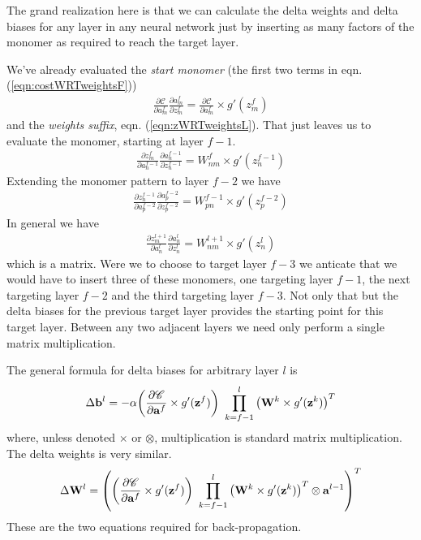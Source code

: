\documentclass[twocolumn]{revtex4-1}
\newcommand{\bld}[1]{\vectorbold{#1}}
\newcommand{\cC}{\mathscr{C}}
\newcommand{\parpar}[2]{\frac{\partial #1}{\partial #2}}
\begin{document}
The grand realization here is that we can calculate the delta weights and delta biases for any layer in any neural network just by inserting as many factors of the monomer as required to reach the target layer.

We've already evaluated the \textit{start monomer} (the first two terms in eqn. (\ref{eqn:costWRTweightsF}))
\begin{align}
    \label{eqn:startMonomer}
    \parpar{\cC}{a^f_m} \parpar{a^f_m}{z^f_m} = \parpar{\cC}{a^f_m} \times g'(z^f_m)
\end{align}
and the \textit{weights suffix}, eqn. (\ref{eqn:zWRTweightsL}). That just leaves us to evaluate the monomer, starting at layer $f-1$.
\begin{align}
    \label{eqn:monomerAtFm1}
    \parpar{z^f_m}{a^{f-1}_n} \parpar{a^{f-1}_n}{z^{f-1}_n} = W^f_{n m} \times g'(z^{f-1}_n)
\end{align}
Extending the monomer pattern to layer $f-2$ we have
\begin{align}
    \label{eqn:monomerAtFm2}
    \parpar{z^{f-1}_n}{a^{f-2}_p} \parpar{a^{f-2}_p}{z^{f-2}_p} = W^{f-1}_{p n} \times g'(z^{f-2}_p)
\end{align}
In general we have 
\begin{align}
    \label{eqn:monomerForTargetL}
    \parpar{z^{l+1}_m}{a^l_n} \parpar{a^l_n}{z^l_n} = W^{l+1}_{n m} \times g'(z^l_n)
\end{align}
which is a matrix. Were we to choose to target layer $f-3$ we anticate that we would have to insert three of these monomers, one targeting layer $f-1$, the next targeting layer $f-2$ and the third targeting layer $f-3$. Not only that but the delta biases for the previous target layer provides the starting point for this target layer. Between any two adjacent layers we need only perform a single matrix multiplication.

The general formula for delta biases for arbitrary layer $l$ is
\begin{align}
    \label{eqn:deltaBiases}
    \Delta \bld{b}^l = -\alpha {\left( \parpar{\cC}{\bld{a}^f} \times g'(\bld{z}^f) \right) \
        \prod_{k = f-1}^l {\left( \bld{W}^k \times g'(\bld{z}^k) \right)}^T}
\end{align}
where, unless denoted $\times$ or $\otimes$, multiplication is standard matrix multiplication. The delta weights is very similar.
\begin{align}
    \label{eqn:deltaWeights}
    \Delta \bld{W}^l = {\left( \left( \parpar{\cC}{\bld{a}^f} \times g'(\bld{z}^f) \right) \
        \prod_{k = f-1}^l {\left( \bld{W}^k \times g'(\bld{z}^k) \right)}^T \otimes \bld{a}^{l-1} \right)}^T
\end{align}
These are the two equations required for back-propagation. 
\end{document}
